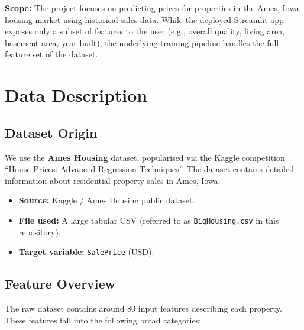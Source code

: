 \documentclass[11pt,a4paper]{article}
\begin{document}
\noindent
\textbf{Scope:}
The project focuses on predicting prices for properties in the Ames, Iowa housing market using historical sales data.
While the deployed Streamlit app exposes only a subset of features to the user (e.g., overall quality, living area, basement area, year built), the underlying training pipeline handles the full feature set of the dataset.

\section{Data Description}

\subsection{Dataset Origin}

We use the \textbf{Ames Housing} dataset, popularised via the Kaggle competition ``House Prices: Advanced Regression Techniques''.
The dataset contains detailed information about residential property sales in Ames, Iowa.

\begin{itemize}[leftmargin=*]
    \item \textbf{Source:} Kaggle / Ames Housing public dataset.
    \item \textbf{File used:} A large tabular CSV (referred to as \texttt{BigHousing.csv} in this repository).
    \item \textbf{Target variable:} \texttt{SalePrice} (USD).
\end{itemize}

\subsection{Feature Overview}

The raw dataset contains around 80 input features describing each property.
These features fall into the following broad categories:
\end{document}

